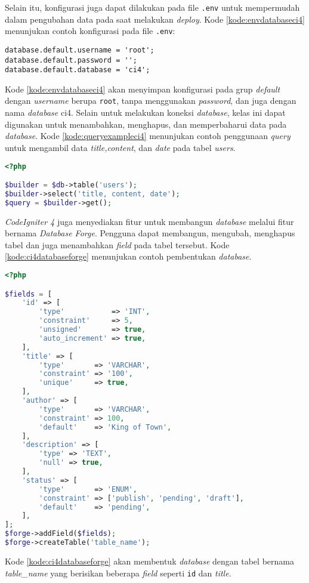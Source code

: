 Selain itu, konfigurasi juga dapat dilakukan pada file \texttt{.env} untuk mempermudah dalam pengubahan data pada saat melakukan \textit{deploy}. Kode \ref{kode:envdatabaseci4} menunjukan contoh konfigurasi pada file \texttt{.env}:
\begin{lstlisting}[caption=Contoh konfigurasi \textit{database} pada file \texttt{.env}. ,label=kode:envdatabaseci4]
database.default.username = 'root';
database.default.password = '';
database.default.database = 'ci4';
\end{lstlisting}

Kode \ref{kode:envdatabaseci4} akan menyimpan konfigurasi pada grup \textit{default} dengan \textit{username} berupa \texttt{root}, tanpa menggunakan \textit{password}, dan juga dengan nama \textit{database} ci4. Selain untuk melakukan koneksi \textit{database}, kelas ini dapat digunakan untuk menambahkan, menghapus, dan memperbaharui data pada \textit{database}. Kode \ref{kode:queryexampleci4} menunjukan contoh penggunaan \textit{query} untuk mengambil data \textit{title,content}, dan \textit{date} pada tabel \textit{users}.

\begin{lstlisting}[language=PHP, caption=Contoh penggunaan \textit{query} menggunakan konfigurasi pada \textit{CodeIgniter 4}. ,label=kode:queryexampleci4]
<?php

$builder = $db->table('users');
$builder->select('title, content, date');
$query = $builder->get();
\end{lstlisting}
\textit{CodeIgniter 4} juga menyediakan fitur untuk membangun \textit{database} melalui fitur bernama \textit{Database Forge}. Pengguna dapat membangun, mengubah, menghapus tabel dan juga menambahkan \textit{field} pada tabel tersebut. Kode \ref{kode:ci4databaseforge} menunjukan contoh pembentukan \textit{database}.
\begin{lstlisting}[language=PHP, caption=Contoh pembentukan tabel melalui \textit{database forge}. ,label=kode:ci4databaseforge]
<?php

$fields = [
    'id' => [
        'type'           => 'INT',
        'constraint'     => 5,
        'unsigned'       => true,
        'auto_increment' => true,
    ],
    'title' => [
        'type'       => 'VARCHAR',
        'constraint' => '100',
        'unique'     => true,
    ],
    'author' => [
        'type'       => 'VARCHAR',
        'constraint' => 100,
        'default'    => 'King of Town',
    ],
    'description' => [
        'type' => 'TEXT',
        'null' => true,
    ],
    'status' => [
        'type'       => 'ENUM',
        'constraint' => ['publish', 'pending', 'draft'],
        'default'    => 'pending',
    ],
];
$forge->addField($fields);
$forge->createTable('table_name');
\end{lstlisting}
Kode \ref{kode:ci4databaseforge} akan membentuk \textit{database} dengan tabel bernama \textit{table\_name} yang berisikan beberapa \textit{field} seperti \texttt{id} dan \textit{title}. 

